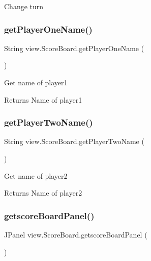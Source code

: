 Change turn \mbox{\label{classview_1_1_score_board_a96e7115d4d1439b44a8c0b4c8a6f624d}} 
\subsubsection{\texorpdfstring{getPlayerOneName()}{getPlayerOneName()}}
{\footnotesize\ttfamily String view.\+Score\+Board.\+get\+Player\+One\+Name (\begin{DoxyParamCaption}{ }\end{DoxyParamCaption})\hspace{0.3cm}{\ttfamily [inline]}}

Get name of player1 \begin{DoxyReturn}{Returns}
Name of player1 
\end{DoxyReturn}
\mbox{\label{classview_1_1_score_board_a820ecd8c47da3e9eea8c191cef014819}} 
\subsubsection{\texorpdfstring{getPlayerTwoName()}{getPlayerTwoName()}}
{\footnotesize\ttfamily String view.\+Score\+Board.\+get\+Player\+Two\+Name (\begin{DoxyParamCaption}{ }\end{DoxyParamCaption})\hspace{0.3cm}{\ttfamily [inline]}}

Get name of player2 \begin{DoxyReturn}{Returns}
Name of player2 
\end{DoxyReturn}
\mbox{\label{classview_1_1_score_board_a138c5f04adeea67eebffb3fa1bd8a555}} 
\subsubsection{\texorpdfstring{getscoreBoardPanel()}{getscoreBoardPanel()}}
{\footnotesize\ttfamily J\+Panel view.\+Score\+Board.\+getscore\+Board\+Panel (\begin{DoxyParamCaption}{ }\end{DoxyParamCaption})\hspace{0.3cm}{\ttfamily [inline]}}

